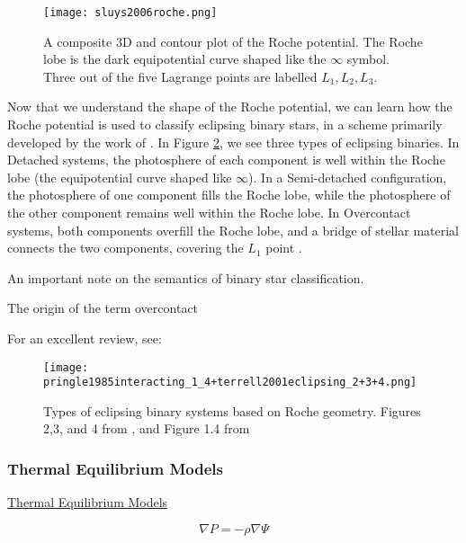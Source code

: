\documentclass[12pt]{article} %
\numberwithin{equation}{section} %
\begin{document}
\begin{figure}[H]
\centering
\texttt{[image: sluys2006roche.png]}
\caption{A composite 3D and contour plot of the Roche potential. The Roche lobe is the dark equipotential curve shaped like the $\infty$ symbol. Three out of the five Lagrange points are labelled $L_{1}, L_{2}, L_{3}$.  \citep{sluys2006roche}}
\label{fig: sluys2006roche}
\end{figure}

Now that we understand the shape of the Roche potential, we can learn how the Roche potential is used to classify eclipsing binary stars, in a scheme primarily developed by the work of \citet{kopal1959close}. In Figure \ref{fig: pringle1985interacting_1_4+terrell2001eclipsing_2+3+4}, we see three types of eclipsing binaries. In Detached systems, the photosphere of each component is well within the Roche lobe (the equipotential curve shaped like $\infty$). In a Semi-detached configuration, the photosphere of one component fills the Roche lobe, while the photosphere of the other component remains well within the Roche lobe. In Overcontact systems, both components overfill the Roche lobe, and a bridge of stellar material connects the two components, covering the $L_{1}$ point \citep{terrell2001eclipsing}.

An important note on the semantics of binary star classification. \citet{kuiper1941interpretation}

The origin of the term overcontact \citep{wilson2001binary}

For an excellent review, see: \citep{kallrath2009eclipsing}

\begin{figure}[H]
\centering
\texttt{[image: pringle1985interacting\_1\_4+terrell2001eclipsing\_2+3+4.png]}
\caption{Types of eclipsing binary systems based on Roche geometry. Figures 2,3, and 4 from \citet{terrell2001eclipsing}, and Figure 1.4 from \citet{pringle1985interacting}}
\label{fig: pringle1985interacting_1_4+terrell2001eclipsing_2+3+4}
\end{figure}

\subsubsection{Thermal Equilibrium Models}{\hyperlink{toc}{Thermal Equilibrium Models}} \label{sec: Thermal Equilibrium Models}

\begin{equation} \label{eqn: equilibrium1}
\nabla P = - \rho \nabla \Psi
\end{equation}
\end{document}
